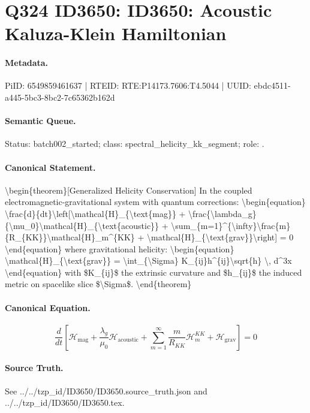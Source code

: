 \section*{Q324 ID3650: ID3650: Acoustic Kaluza-Klein Hamiltonian}
\paragraph{Metadata.}
PiID: 6549859461637 | RTEID: RTE:P14173.7606:T4.5044 | UUID: ebdc4511-a445-5bc3-8bc2-7c65362b162d

\paragraph{Semantic Queue.}
Status: batch002\_started; class: spectral\_helicity\_kk\_segment; role: .

\paragraph{Canonical Statement.}
\textbackslash{}begin\{theorem\}[Generalized Helicity Conservation] In the coupled electromagnetic-gravitational system with quantum corrections: \textbackslash{}begin\{equation\} \textbackslash{}frac\{d\}\{dt\}\textbackslash{}left[\textbackslash{}mathcal\{H\}\_\{\textbackslash{}text\{mag\}\} + \textbackslash{}frac\{\textbackslash{}lambda\_g\}\{\textbackslash{}mu\_0\}\textbackslash{}mathcal\{H\}\_\{\textbackslash{}text\{acoustic\}\} + \textbackslash{}sum\_\{m=1\}\textasciicircum{}\{\textbackslash{}infty\}\textbackslash{}frac\{m\}\{R\_\{KK\}\}\textbackslash{}mathcal\{H\}\_m\textasciicircum{}\{KK\} + \textbackslash{}mathcal\{H\}\_\{\textbackslash{}text\{grav\}\}\textbackslash{}right] = 0 \textbackslash{}end\{equation\} where gravitational helicity: \textbackslash{}begin\{equation\} \textbackslash{}mathcal\{H\}\_\{\textbackslash{}text\{grav\}\} = \textbackslash{}int\_\{\textbackslash{}Sigma\} K\_\{ij\}h\textasciicircum{}\{ij\}\textbackslash{}sqrt\{h\} \textbackslash{}, d\textasciicircum{}3x \textbackslash{}end\{equation\} with \$K\_\{ij\}\$ the extrinsic curvature and \$h\_\{ij\}\$ the induced metric on spacelike slice \$\textbackslash{}Sigma\$. \textbackslash{}end\{theorem\}

\paragraph{Canonical Equation.}
\[
\begin{equation} \frac{d}{dt}\left[\mathcal{H}_{\text{mag}} + \frac{\lambda_g}{\mu_0}\mathcal{H}_{\text{acoustic}} + \sum_{m=1}^{\infty}\frac{m}{R_{KK}}\mathcal{H}_m^{KK} + \mathcal{H}_{\text{grav}}\right] = 0 \end{equation}
\]

\paragraph{Source Truth.}
See ../../tzp\_id/ID3650/ID3650.source\_truth.json and ../../tzp\_id/ID3650/ID3650.tex.

